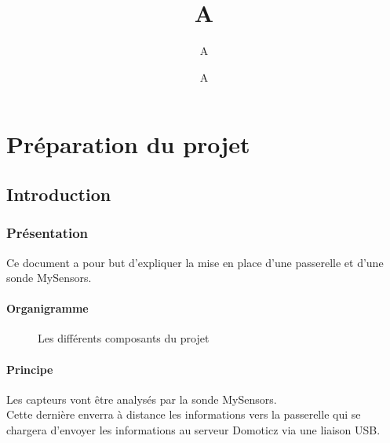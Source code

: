 \documentclass[12pt]{report}
\title{#1}
\author{#2}
\date{#3}
\newcommand{\setHeader}[3]{
\title{#1}
\author{#2}
\date{#3}
\maketitle
}
\begin{document}
\setHeader{A}{A}{A}
\tableofcontents
\setcounter{page}{2}
\part{Préparation du projet}

\chapter{Introduction}

\section{Présentation}

Ce document a pour but d'expliquer la mise en place d'une passerelle et d'une sonde MySensors.

\subsection{Organigramme}

\begin{figure}[h]
  \centering
{} 
\caption{Les différents composants du projet}
\end{figure}

  \subsection{Principe}

  Les capteurs vont être analysés par la sonde MySensors.\\
  Cette dernière enverra à distance les informations vers la passerelle qui se chargera d'envoyer les informations au serveur Domoticz via une liaison USB.\\
\end{document}
